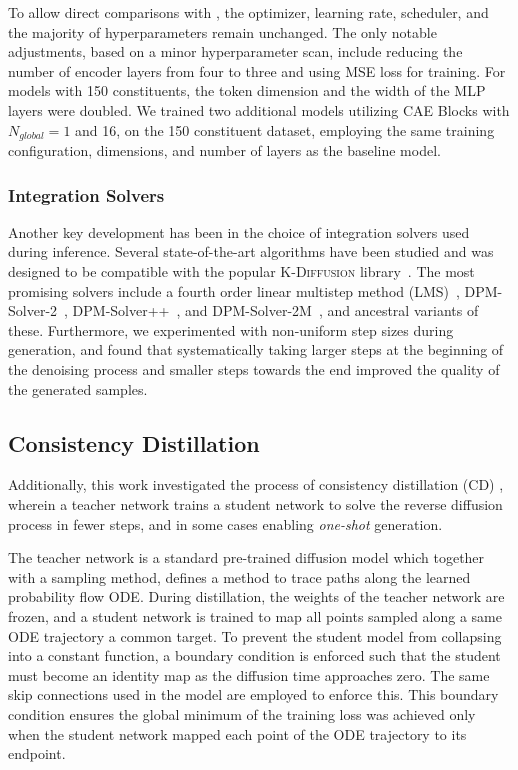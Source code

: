 To allow direct comparisons with \pcjedi, the optimizer, learning rate, scheduler, and the majority of hyperparameters remain unchanged.
The only notable adjustments, based on a minor hyperparameter scan, include reducing the number of encoder layers from four to three and using MSE loss for training.
For models with 150 constituents, the token dimension and the width of the MLP layers were doubled.
We trained two additional models utilizing CAE Blocks with $N_{global}=1$ and 16, on the 150 constituent dataset, employing the same training configuration, dimensions, and number of layers as the baseline model.

\subsubsection{Integration Solvers}

Another key development has been in the choice of integration solvers used during inference.
Several state-of-the-art algorithms have been studied and \pcdroid was designed to be compatible with the popular \textsc{K-Diffusion} library~\cite{KDiffusion}.
The most promising solvers include a fourth order linear multistep method (LMS)~\cite{ODEBook}, DPM-Solver-2~\cite{DPMSolverFastODE}, DPM-Solver++~\cite{DPMSolverFastSolver}, and DPM-Solver-2M~\cite{DPMSolverFastSolver}, and ancestral variants of these.
Furthermore, we experimented with non-uniform step sizes during generation, and found that systematically taking larger steps at the beginning of the denoising process and smaller steps towards the end improved the quality of the generated samples.

\subsection{Consistency Distillation}

Additionally, this work investigated the process of consistency distillation (CD) \cite{ConsistencyModels}, wherein a teacher network trains a student network to solve the reverse diffusion process in fewer steps, and in some cases enabling \textit{one-shot} generation.

The teacher network is a standard pre-trained diffusion model which together with a sampling method, defines a method to trace paths along the learned probability flow ODE.
During distillation, the weights of the teacher network are frozen, and a student network is trained to map all points sampled along a same ODE trajectory a common target.
To prevent the student model from collapsing into a constant function, a boundary condition is enforced such that the student must become an identity map as the diffusion time approaches zero.
The same skip connections used in the \pcdroid model are employed to enforce this.
This boundary condition ensures the global minimum of the training loss was achieved only when the student network mapped each point of the ODE trajectory to its endpoint.


